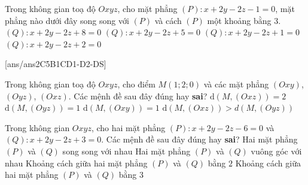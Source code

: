 \begin{ex}%
	Trong không gian toạ độ $Oxyz$, cho mặt phẳng $(P)\colon x+2y-2z-1=0$, mặt phẳng nào dưới đây song song với $(P)$ và cách $(P)$ một khoảng bằng $3$.
	\choice
	{\True $(Q)\colon x+2y-2z+8=0$}
	{$(Q)\colon x+2y-2z+5=0$}
	{$(Q)\colon x+2y-2z+1=0$}
	{$(Q)\colon x+2y-2z+2=0$}
\end{ex}
\TNTF
{}[ans/ans2C5B1CD1-D2-DS]
\begin{ex}%
	Trong không gian toạ độ $Oxyz$, cho điểm $M\left(1;2;0\right)$ và các mặt phẳng $(Oxy)$, $(Oyz)$, $(Oxz)$. Các mệnh đề sau đây đúng hay \textbf{sai}?
	\choiceTF
	{\True $\mathrm{d}\left(M,(Oxz)\right)=2$}
	{\True $\mathrm{d}\left(M,(Oyz)\right)=1$}
	{$\mathrm{d}\left(M,(Oxy)\right)=1$}
	{\True $\mathrm{d}\left(M,(Oxz)\right)>d\left(M,(Oyz)\right)$}
\end{ex}
\begin{ex}%
	Trong không gian $Oxyz$, cho hai mặt phẳng $(P)\colon x+2y-2z-6=0$ và $(Q)\colon x+2y-2z+3=0$. Các mệnh đề sau đây đúng hay \textbf{sai}?
	\choiceTF
	{\True Hai mặt phẳng $(P)$ và $(Q)$ song song với nhau}
	{Hai mặt phẳng $(P)$ và $(Q)$ vuông góc với nhau}
	{Khoảng cách giữa hai mặt phẳng $(P)$ và $(Q)$ bằng $2$}
	{\True Khoảng cách giữa hai mặt phẳng $(P)$ và $(Q)$ bằng $3$}
\end{ex}

